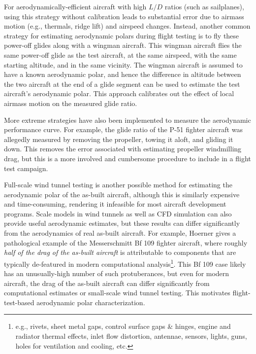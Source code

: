 For aerodynamically-efficient aircraft with high $L/D$ ratios (such as sailplanes), using this strategy without calibration leads to substantial error due to airmass motion (e.g., thermals, ridge lift) and airspeed changes. Instead, another common strategy for estimating aerodynamic polars during flight testing is to fly these power-off glides along with a wingman aircraft. This wingman aircraft flies the same power-off glide as the test aircraft, at the same airspeed, with the same starting altitude, and in the same vicinity. The wingman aircraft is assumed to have a known aerodynamic polar, and hence the difference in altitude between the two aircraft at the end of a glide segment can be used to estimate the test aircraft's aerodynamic polar. This approach calibrates out the effect of local airmass motion on the measured glide ratio.

More extreme strategies have also been implemented to measure the aerodynamic performance curve. For example, the glide ratio of the P-51 fighter aircraft was allegedly measured by removing the propeller, towing it aloft, and gliding it down. This removes the error associated with estimating propeller windmilling drag, but this is a more involved and cumbersome procedure to include in a flight test campaign.

Full-scale wind tunnel testing is another possible method for estimating the aerodynamic polar of the as-built aircraft, although this is similarly expensive and time-consuming, rendering it infeasible for most aircraft development programs. Scale models in wind tunnels as well as CFD simulation can also provide useful aerodynamic estimates, but these results can differ significantly from the aerodynamics of real as-built aircraft. For example, Hoerner \cite{hoerner_fluiddynamic_1965} gives a pathological example of the Messerschmitt Bf 109 fighter aircraft, where roughly \emph{half of the drag of the as-built aircraft} is attributable to components that are typically de-featured in modern computational analysis\footnote{e.g., rivets, sheet metal gaps, control surface gaps \& hinges, engine and radiator thermal effects, inlet flow distortion, antennae, sensors, lights, guns, holes for ventilation and cooling, etc.}. This Bf 109 case likely has an unusually-high number of such protuberances, but even for modern aircraft, the drag of the as-built aircraft can differ significantly from computational estimates or small-scale wind tunnel testing. This motivates flight-test-based aerodynamic polar characterization.

